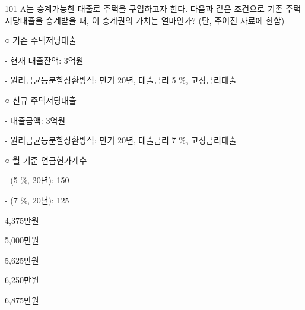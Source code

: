 \begin{question}{101}
A는 승계가능한 대출로 주택을 구입하고자 한다. 다음과 같은 조건으로 기존 주택저당대출을 승계받을 때, 이 승계권의 가치는 얼마인가? (단, 주어진 자료에 한함)
\begin{framedtext}
○ 기존 주택저당대출 \par
- 현재 대출잔액: 3억원 \par
- 원리금균등분할상환방식: 만기 20년, 대출금리 5 \%, 고정금리대출 \par
○ 신규 주택저당대출 \par
- 대출금액: 3억원 \par
- 원리금균등분할상환방식: 만기 20년, 대출금리 7 \%, 고정금리대출 \par
○ 월 기준 연금현가계수 \par
- (5 \%, 20년): 150 \par
- (7 \%, 20년): 125
\end{framedtext}
\begin{choices}
  \item 4,375만원
  \item 5,000만원
  \item 5,625만원
  \item 6,250만원
  \item 6,875만원
\end{choices}
\end{question}
